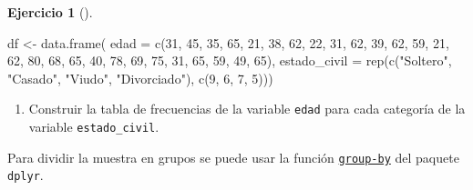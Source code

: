 \documentclass[
  a4paper,
]{scrreport}
\newenvironment{Shaded}{\begin{snugshade}}{\end{snugshade}}
\newcommand{\AttributeTok}[1]{\textcolor[rgb]{0.40,0.45,0.13}{#1}}
\newcommand{\DecValTok}[1]{\textcolor[rgb]{0.68,0.00,0.00}{#1}}
\newcommand{\FunctionTok}[1]{\textcolor[rgb]{0.28,0.35,0.67}{#1}}
\newcommand{\NormalTok}[1]{\textcolor[rgb]{0.00,0.23,0.31}{#1}}
\newcommand{\OtherTok}[1]{\textcolor[rgb]{0.00,0.23,0.31}{#1}}
\newcommand{\StringTok}[1]{\textcolor[rgb]{0.13,0.47,0.30}{#1}}
\providecommand{\tightlist}{%
  \setlength{\itemsep}{0pt}\setlength{\parskip}{0pt}}\usepackage{longtable,booktabs,array}
\theoremstyle{definition}
\newtheorem{exercise}{Ejercicio}[chapter]
\theoremstyle{remark}
\begin{document}
\begin{exercise}[]
\begin{tcolorbox}
\begin{Shaded}
\begin{Highlighting}[]
\NormalTok{df }\OtherTok{\textless{}{-}} \FunctionTok{data.frame}\NormalTok{(}
    \AttributeTok{edad =} \FunctionTok{c}\NormalTok{(}\DecValTok{31}\NormalTok{, }\DecValTok{45}\NormalTok{, }\DecValTok{35}\NormalTok{, }\DecValTok{65}\NormalTok{, }\DecValTok{21}\NormalTok{, }\DecValTok{38}\NormalTok{, }\DecValTok{62}\NormalTok{, }\DecValTok{22}\NormalTok{, }\DecValTok{31}\NormalTok{, }\DecValTok{62}\NormalTok{, }\DecValTok{39}\NormalTok{, }\DecValTok{62}\NormalTok{, }\DecValTok{59}\NormalTok{, }\DecValTok{21}\NormalTok{, }\DecValTok{62}\NormalTok{, }\DecValTok{80}\NormalTok{, }\DecValTok{68}\NormalTok{, }\DecValTok{65}\NormalTok{, }\DecValTok{40}\NormalTok{, }\DecValTok{78}\NormalTok{, }\DecValTok{69}\NormalTok{, }\DecValTok{75}\NormalTok{, }\DecValTok{31}\NormalTok{, }\DecValTok{65}\NormalTok{, }\DecValTok{59}\NormalTok{, }\DecValTok{49}\NormalTok{, }\DecValTok{65}\NormalTok{), }
    \AttributeTok{estado\_civil =} \FunctionTok{rep}\NormalTok{(}\FunctionTok{c}\NormalTok{(}\StringTok{"Soltero"}\NormalTok{, }\StringTok{"Casado"}\NormalTok{, }\StringTok{"Viudo"}\NormalTok{, }\StringTok{"Divorciado"}\NormalTok{), }\FunctionTok{c}\NormalTok{(}\DecValTok{9}\NormalTok{, }\DecValTok{6}\NormalTok{, }\DecValTok{7}\NormalTok{, }\DecValTok{5}\NormalTok{)))}
\end{Highlighting}
\end{Shaded}

\end{tcolorbox}

\begin{enumerate}
\def\labelenumi{\alph{enumi}.}
\setcounter{enumi}{1}
\tightlist
\item
  Construir la tabla de frecuencias de la variable \texttt{edad} para
  cada categoría de la variable \texttt{estado\_civil}.
\end{enumerate}

\begin{tcolorbox}[enhanced jigsaw, rightrule=.15mm, toptitle=1mm, colbacktitle=quarto-callout-tip-color!10!white, titlerule=0mm, colback=white, leftrule=.75mm, bottomtitle=1mm, colframe=quarto-callout-tip-color-frame, breakable, title=\textcolor{quarto-callout-tip-color}{\faLightbulb}\hspace{0.5em}{Solución}, arc=.35mm, coltitle=black, opacityback=0, bottomrule=.15mm, opacitybacktitle=0.6, left=2mm, toprule=.15mm]

Para dividir la muestra en grupos se puede usar la función
\href{https://aprendeconalf.es/manual-r/06-preprocesamiento.html\#res\%C3\%BAmenes-por-grupos}{\texttt{group-by}}
del paquete \texttt{dplyr}.


\end{tcolorbox}
\end{exercise}
\end{document}
